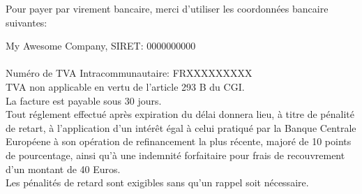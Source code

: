 \documentclass{invoice}
\begin{document}
\vspace{-100 pt}
      \fboxrule=1pt
\fboxsep=10pt
\begin{minipage}{0.5\linewidth}
  \centering Pour payer par virement bancaire, merci d'utiliser les coordonnées bancaire suivantes:\\
  \vspace*{10 pt}
\end{minipage}  
\vspace{1 cm}
\vspace*{\fill}
  \begin{center}
    \footnotesize{My Awesome Company, SIRET: 0000000000}\\
    \footnotesize{}\\
    \footnotesize{Numéro de TVA Intracommunautaire: FRXXXXXXXXX}\\
    \footnotesize{
              TVA non applicable en vertu de l'article 293 B du CGI.
          }\\
    \footnotesize{La facture est payable sous 30 jours.}\\
    \footnotesize{Tout réglement effectué après expiration du délai donnera lieu, à titre de pénalité de retart, à l'application
    d'un intérêt égal à celui pratiqué par la Banque Centrale Européene à son opération de refinancement la plus récente,
    majoré de 10 points de pourcentage, ainsi qu'à une indemnité forfaitaire pour frais de recouvrement d'un montant de 40 Euros.}\\
    \footnotesize{Les pénalités de retard sont exigibles sans qu'un rappel soit nécessaire.}
  \end{center}
\end{document}
